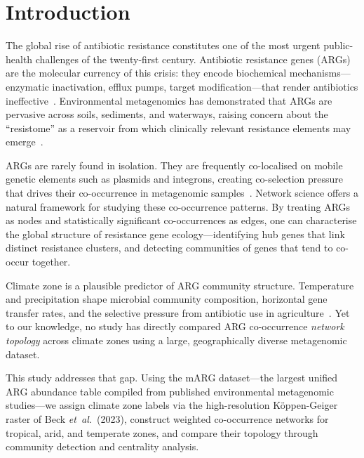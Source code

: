 \documentclass[12pt,a4paper]{article}
\begin{document}

\section{Introduction}\label{intro}

The global rise of antibiotic resistance constitutes one of the most
urgent public-health challenges of the twenty-first century.
Antibiotic resistance genes (ARGs) are the molecular currency of this
crisis: they encode biochemical mechanisms---enzymatic inactivation,
efflux pumps, target modification---that render antibiotics
ineffective~\cite{WHO2023}.
Environmental metagenomics has demonstrated that ARGs are pervasive
across soils, sediments, and waterways, raising concern about the
``resistome'' as a reservoir from which clinically relevant resistance
elements may emerge~\cite{Allen2010}.

ARGs are rarely found in isolation.
They are frequently co-localised on mobile genetic elements such as
plasmids and integrons, creating co-selection pressure that drives
their co-occurrence in metagenomic samples~\cite{Partridge2018}.
Network science offers a natural framework for studying these
co-occurrence patterns.
By treating ARGs as nodes and statistically significant co-occurrences
as edges, one can characterise the global structure of resistance gene
ecology---identifying hub genes that link distinct resistance clusters,
and detecting communities of genes that tend to co-occur together.

Climate zone is a plausible predictor of ARG community structure.
Temperature and precipitation shape microbial community composition,
horizontal gene transfer rates, and the selective pressure from
antibiotic use in agriculture~\cite{vanBoeckel2014, Cavicchioli2019}.
Yet to our knowledge, no study has directly compared ARG co-occurrence
\emph{network topology} across climate zones using a large,
geographically diverse metagenomic dataset.

This study addresses that gap.
Using the mARG dataset---the largest unified ARG abundance table
compiled from published environmental metagenomic studies---we
assign climate zone labels via the high-resolution
K{\"o}ppen-Geiger raster of Beck \emph{et~al.}\ (2023), construct
weighted co-occurrence networks for tropical, arid, and temperate
zones, and compare their topology through community detection and
centrality analysis.
\end{document}
